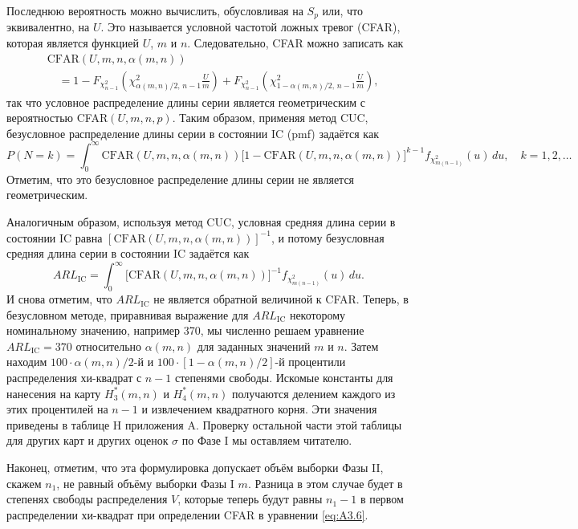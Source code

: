 Последнюю вероятность можно вычислить, обусловливая на \(S_p\) или, что эквивалентно, на \(U\). Это называется условной частотой ложных тревог (CFAR), которая является функцией \(U\), \(m\) и \(n\). Следовательно, CFAR можно записать как
\begin{equation}
\begin{aligned}
	&\mathrm{CFAR}(U, m, n, \alpha(m,n)) \\
	&\quad = 1 - F_{\chi^2_{n-1}}\left(\chi^2_{\alpha(m,n)/2,\,n-1}\frac{U}{m}\right)
	       + F_{\chi^2_{n-1}}\left(\chi^2_{1-\alpha(m,n)/2,\,n-1}\frac{U}{m}\right),
\end{aligned}
\tag{A3.6}
\label{eq:A3.6}
\end{equation}
так что условное распределение длины серии является геометрическим с вероятностью CFAR\((U, m, n, p)\). Таким образом, применяя метод CUC, безусловное распределение длины серии в состоянии IC (pmf) задаётся как
\[
	P(N = k) = \int_0^{\infty} \mathrm{CFAR}(U, m, n, \alpha(m,n))
	\big[1 - \mathrm{CFAR}(U, m, n, \alpha(m,n))\big]^{k-1}
	f_{\chi^2_{m(n-1)}}(u)\,du, \quad k = 1, 2, \ldots
\]
Отметим, что это безусловное распределение длины серии не является геометрическим.

Аналогичным образом, используя метод CUC, условная средняя длина серии в состоянии IC равна \([\mathrm{CFAR}(U, m, n, \alpha(m,n))]^{-1}\), и потому безусловная средняя длина серии в состоянии IC задаётся как
\begin{equation}
	ARL_{\text{IC}} = \int_0^{\infty} \big[\mathrm{CFAR}(U, m, n, \alpha(m,n))\big]^{-1}
	f_{\chi^2_{m(n-1)}}(u)\,du.
	\tag{A3.7}
	\label{eq:A3.7}
\end{equation}
И снова отметим, что \(ARL_{\text{IC}}\) не является обратной величиной к CFAR. Теперь, в безусловном методе, приравнивая выражение для \(ARL_{\text{IC}}\) некоторому номинальному значению, например 370, мы численно решаем уравнение \(ARL_{\text{IC}} = 370\) относительно \(\alpha(m,n)\) для заданных значений \(m\) и \(n\). Затем находим \(100\cdot\alpha(m,n)/2\)-й и \(100\cdot[1 - \alpha(m,n)/2]\)-й процентили распределения хи-квадрат с \(n - 1\) степенями свободы. Искомые константы для нанесения на карту \(H_3^*(m,n)\) и \(H_4^*(m,n)\) получаются делением каждого из этих процентилей на \(n - 1\) и извлечением квадратного корня. Эти значения приведены в таблице H приложения A. Проверку остальной части этой таблицы для других карт и других оценок \(\sigma\) по Фазе I мы оставляем читателю.

Наконец, отметим, что эта формулировка допускает объём выборки Фазы II, скажем \(n_1\), не равный объёму выборки Фазы I \(m\). Разница в этом случае будет в степенях свободы распределения \(V\), которые теперь будут равны \(n_1 - 1\) в первом распределении хи-квадрат при определении CFAR в уравнении \eqref{eq:A3.6}.
